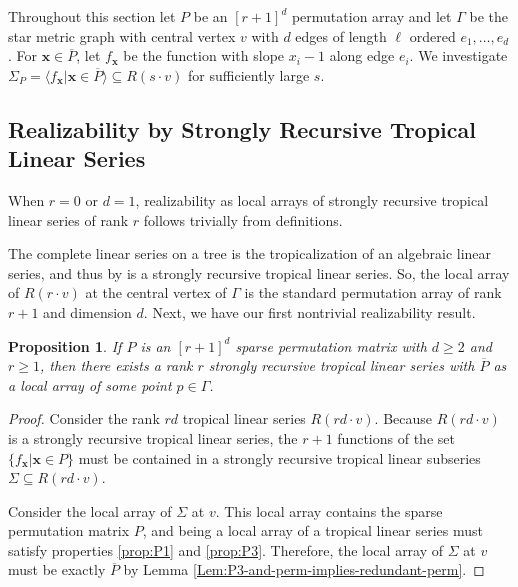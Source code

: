 \documentclass{amsart}
\newtheorem{proposition}[theorem]{Proposition}
\begin{document}
	Throughout this section let $P$ be an $[r+1]^d$ permutation array and let $\Gamma$ be the star metric graph with central vertex $v$ with $d$ edges of length $\ell$ ordered $e_1, \ldots, e_d$. For $\mathbf{x} \in \overline{P}$, let $f_{\mathbf{x}}$ be the function with slope $x_i - 1$ along edge $e_i$. We investigate $\Sigma_P = \langle f_{\mathbf{x}} | \mathbf{x} \in \overline{P} \rangle \subseteq R(s \cdot v)$ for sufficiently large $s$.
	
	\subsection{Realizability by Strongly Recursive Tropical Linear Series}
	\label{Subsec:real-by-SRTLS}
	
	When $r = 0$ or $d = 1$, realizability as local arrays of strongly recursive tropical linear series of rank $r$ follows trivially from definitions.
	
	The complete linear series on a tree is the tropicalization of an algebraic linear series, and thus by \cite[Section~6]{farkas2025kodairadimensionsoverlinemathcalm22overlinemathcalm23} is a strongly recursive tropical linear series. So, the local array of $R(r \cdot v)$ at the central vertex of $\Gamma$ is the standard permutation array of rank $r+1$ and dimension $d$. Next, we have our first nontrivial realizability result.
	
	\begin{proposition}
		\label{Prop:realizability-of-sparse-perm-arrays}
		If $P$ is an $[r+1]^d$ sparse permutation matrix with $d \geq 2$ and $r \geq 1$, then there exists a rank $r$ strongly recursive tropical linear series with $\overline{P}$ as a local array of some point $p \in \Gamma$.
	\end{proposition}
	
	\begin{proof}
		Consider the rank $rd$ tropical linear series $R(rd \cdot v)$. Because $R(rd \cdot v)$ is a strongly recursive tropical linear series, the $r+1$ functions of the set $\{ f_{\mathbf{x}} | \mathbf{x} \in P \}$ must be contained in a strongly recursive tropical linear subseries $\Sigma \subseteq R(rd \cdot v)$.
		
		Consider the local array of $\Sigma$ at $v$. This local array contains the sparse permutation matrix $P$, and being a local array of a tropical linear series must satisfy properties \ref{prop:P1} and \ref{prop:P3}. Therefore, the local array of $\Sigma$ at $v$ must be exactly $\overline{P}$ by Lemma \ref{Lem:P3-and-perm-implies-redundant-perm}.
	\end{proof}
	
\end{document}
